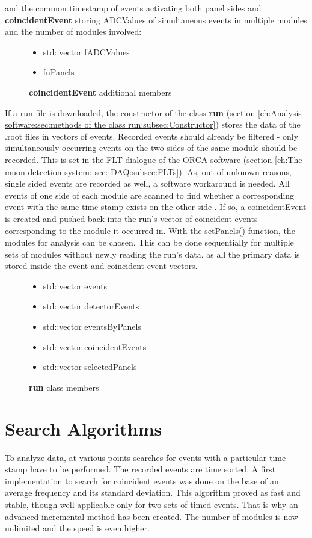     and the common timestamp of events activating both panel sides and
    {\bf coincidentEvent} storing ADCValues of simultaneous events in multiple modules and the number of modules involved:
    \begin{figure}[H]
      \caption*{{\bf coincidentEvent} additional members}
	\begin{itemize}
	  \item std::vector fADCValues
	  \item fnPanels
      \end{itemize}
    \end{figure}
    If a run file is downloaded, the constructor of the class {\bf run} (section \ref{ch:Analysis software:sec:methods of the class run:subsec:Constructor}) stores the data of the .root files in vectors of events.
    Recorded events should already be filtered - only simultaneously occurring events on the two sides of the same module should be recorded. This is set in the FLT dialogue of the ORCA software (section \ref{ch:The muon detection system: sec: DAQ:subsec:FLTs}). As, out of unknown reasons, single sided events are recorded as well, a software workaround is needed. All events of one side of each module are scanned to find whether a corresponding event with the same time stamp exists on the other side . If so, a coincidentEvent is created and pushed back into the run's vector of coincident events corresponding to the module it occurred in.
    With the setPanels() function, the modules for analysis can be chosen. This can be done sequentially for multiple sets of modules without newly reading the run's data, as all the primary data is stored inside the event and coincident event vectors.
    \begin{figure}[h]
      \caption*{{\bf run} class members}
	\begin{itemize}
	  \item std::vector events
	  \item std::vector detectorEvents
	  \item std::vector eventsByPanels
	  \item std::vector coincidentEvents
	  \item std::vector selectedPanels
      \end{itemize}
    \end{figure}
    
    
  
  \section{Search Algorithms}
  \label{ch:Analysis software:sec:Search algorithms}
    To analyze data, at various points searches for events with a particular time stamp have to be performed. The recorded events are time sorted. A first implementation to search for coincident events was done on the base of an average frequency and its standard deviation. This algorithm proved as fast and stable, though well applicable only for two sets of timed events. That is why an advanced incremental method has been created. The number of modules is now unlimited and the speed is even higher.
